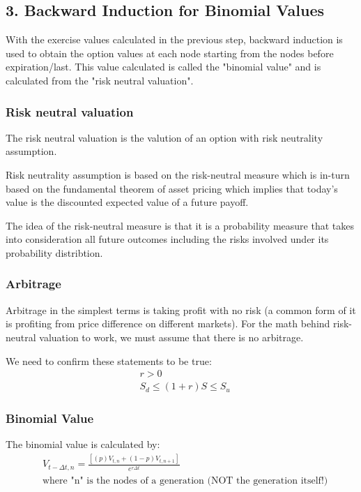 \documentclass[12pt, letterpaper]{article}
\begin{document}
\pagebreak
\subsection*{3. Backward Induction for Binomial Values}
With the exercise values calculated in the previous step, backward induction is used to obtain the option values at each node starting from the nodes before expiration/last.
This value calculated is called the "binomial value" and is calculated from the "risk neutral valuation".

\subsubsection*{Risk neutral valuation}
The risk neutral valuation is the valution of an option with risk neutrality assumption.

Risk neutrality assumption is based on the risk-neutral measure which is in-turn based on the fundamental theorem of asset pricing which implies that today's value is the discounted expected value of a future payoff.

The idea of the risk-neutral measure is that it is a probability measure that takes into consideration all future outcomes including the risks involved under its probability distribtion.


\subsubsection*{Arbitrage}
Arbitrage in the simplest terms is taking profit with no risk (a common form of it is profiting from price difference on different markets).
For the math behind risk-neutral valuation to work, we must assume that there is no arbitrage.

We need to confirm these statements to be true:
\begin{align*}
  & {r > 0} \\
  & S_d \leq (1+r)S \leq S_u
\end{align*}


\subsubsection*{Binomial Value}
The binomial value is calculated by:
\begin{align*}
  & V_{t-\Delta t, n} = \frac{[(p)V_{t,n} + (1-p)V_{t,n+1}]}{e^{r\Delta t}}
  \\
  & \textrm{where "n" is the nodes of a generation (NOT the generation itself!)}
\end{align*}
\end{document}
